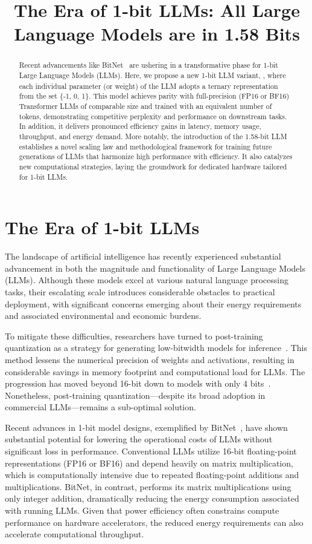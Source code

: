 \title{The Era of 1-bit LLMs: All Large Language Models are in 1.58 Bits}

\begin{abstract}
Recent advancements like BitNet~\cite{bitnet} are ushering in a transformative phase for 1-bit Large Language Models (LLMs). Here, we propose a new 1-bit LLM variant, \textbf{}, where each individual parameter (or weight) of the LLM adopts a ternary representation from the set \{-1, 0, 1\}. This model achieves parity with full-precision (FP16 or BF16) Transformer LLMs of comparable size and trained with an equivalent number of tokens, demonstrating competitive perplexity and performance on downstream tasks. In addition, it delivers pronounced efficiency gains in latency, memory usage, throughput, and energy demand. More notably, the introduction of the 1.58-bit LLM establishes a novel scaling law and methodological framework for training future generations of LLMs that harmonize high performance with efficiency. It also catalyzes new computational strategies, laying the groundwork for dedicated hardware tailored for 1-bit LLMs.
\end{abstract}

\section{The Era of 1-bit LLMs}

The landscape of artificial intelligence has recently experienced substantial advancement in both the magnitude and functionality of Large Language Models (LLMs). Although these models excel at various natural language processing tasks, their escalating scale introduces considerable obstacles to practical deployment, with significant concerns emerging about their energy requirements and associated environmental and economic burdens.

To mitigate these difficulties, researchers have turned to post-training quantization as a strategy for generating low-bitwidth models for inference~\cite{smoothquant, gptq, quip, quip_sharp}. This method lessens the numerical precision of weights and activations, resulting in considerable savings in memory footprint and computational load for LLMs. The progression has moved beyond 16-bit down to models with only 4 bits~\cite{gptq, awq}. Nonetheless, post-training quantization—despite its broad adoption in commercial LLMs—remains a sub-optimal solution.

Recent advances in 1-bit model designs, exemplified by BitNet~\cite{bitnet}, have shown substantial potential for lowering the operational costs of LLMs without significant loss in performance. Conventional LLMs utilize 16-bit floating-point representations (FP16 or BF16) and depend heavily on matrix multiplication, which is computationally intensive due to repeated floating-point additions and multiplications. BitNet, in contrast, performs its matrix multiplications using only integer addition, dramatically reducing the energy consumption associated with running LLMs. Given that power efficiency often constrains compute performance on hardware accelerators, the reduced energy requirements can also accelerate computational throughput.

